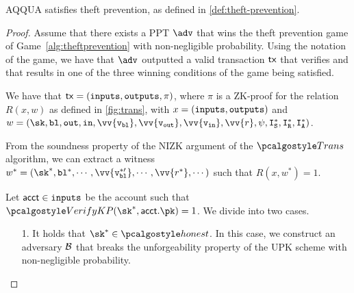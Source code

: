 
\begin{theorem}
    AQQUA satisfies theft prevention, as defined in \autoref{def:theft-prevention}.
\end{theorem}
\begin{proof}
    Assume that there exists a PPT $\adv$ that wins the theft prevention game of Game~\ref{alg:theftprevention} with non-negligible probability. Using the notation of the game, we have that $\adv$ outputted a valid transaction $\textup{\textsf{tx}}$ that verifies and that results in one of the three winning conditions of the game being satisfied.
    

   We have that $\textup{\textsf{tx}} = ({\textup{\texttt{inputs}}}, {\textup{\texttt{outputs}}}, \pi)$, where $\pi$ is a ZK-proof for the relation $R(x,w)$ as defined in \autoref{fig:trans}, with $x = ({\textup{\texttt{inputs}}}, {\textup{\texttt{outputs}}})$ and $w= (\sk, \varbl, \varout, \varin, \vv{\vbl}, \vv{\vout}, \vv{\vin}, \vv{r}, \psi, \isset^*, \irset^*, \ianset^*)$.
   
    From the soundness property of the NIZK argument of the $\trans$ algorithm, we can extract a witness $w^*= (\sk^*, \varbl^*, \cdots, \vv{\vbl^{*\prime}}, \cdots, \vv{r^*}, \cdots)$ such that $R(x, w^*)=1$.


    Let $\textup{\textsf{acct}}\in {\textup{\texttt{inputs}}}$ be the account such that $\verkp(\sk^*, \acct.\pk) = 1$.
    We divide into two cases.
   \begin{itemize}
    \item[1.] It holds that $\sk^* \in \honest$. In this case, we construct an adversary $\mathcal{B}$ that breaks the unforgeability property of the UPK scheme with non-negligible probability.
    

\end{itemize}
\end{proof}
